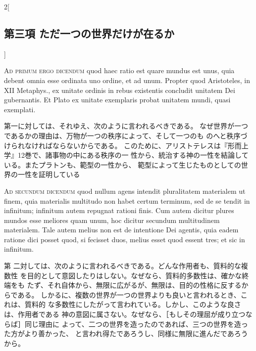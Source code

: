 \documentclass[paper=a4paper,fontsize=10pt,jafontsize=9pt,titlepage]{jlreq}
\begin{document}
\begin{paracol}{2}[\subsection{第三項 ただ一つの世界だけが在るか}]
\switchcolumn*[\subsection{ad.1}]


{\scshape Ad primum ergo dicendum} quod haec ratio est quare mundus est
unus, quia debent omnia esse ordinata uno ordine, et ad unum. Propter
quod Aristoteles, in XII Metaphys.{\itshape }, ex unitate ordinis in
rebus existentis concludit unitatem Dei gubernantis. Et Plato ex unitate
exemplaris probat unitatem mundi, quasi exemplati.


\switchcolumn


第一に対しては、それゆえ、次のように言われるべきである。
なぜ世界が一つであるかの理由は、万物が一つの秩序によって、そして一つのも
 のへと秩序づけられなければならないからである。
このために、アリストテレスは『形而上学』12巻で、諸事物の中にある秩序の一
 性から、統治する神の一性を結論している。またプラトンも、範型の一性から、
 範型によって生じたものとしての世界の一性を証明している


\switchcolumn*[\subsection{ad.2}]


{\scshape Ad secundum dicendum} quod nullum agens intendit pluralitatem
materialem ut finem, quia materialis multitudo non habet certum
terminum, sed de se tendit in infinitum; infinitum autem repugnat
rationi finis. Cum autem dicitur plures mundos esse meliores quam unum,
hoc dicitur secundum multitudinem materialem. Tale autem melius non est
de intentione Dei agentis, quia eadem ratione dici posset quod, si
fecisset duos, melius esset quod essent tres; et sic in infinitum.


\switchcolumn


第
二対しては、次のように言われるべきである。どんな作用者も、質料的な複数性
を目的として意図したりはしない。なぜなら、質料的多数性は、確かな終端をも
たず、それ自体から、無限に広がるが、無限は、目的の性格に反するからである。
しかるに、複数の世界が一つの世界よりも良いと言われるとき、これは、質料的
な多数性にしたがって言われている。しかし、このような良さは、作用者である
神の意図に属さない。なぜなら、［もしその理屈が成り立つならば］同じ理由に
よって、二つの世界を造ったのであれば、三つの世界を造った方がより善かった、
と言われ得たであろうし、同様に無限に進んだであろうから。


\switchcolumn*[\subsection{ad.3}]



\end{paracol}
\end{document}
